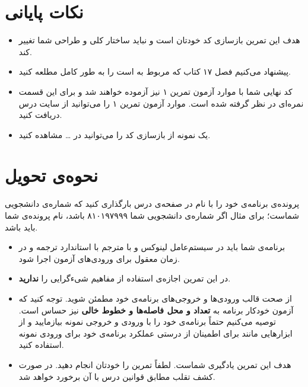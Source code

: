 \documentclass{utap}
\begin{document}
\section{نکات پایانی}
	  \begin{itemize}
	        \item
هدف این تمرین بازسازی کد خودتان است و نباید ساختار کلی و طراحی شما تغییر کند.
		\item
پیشنهاد می‌کنیم فصل ۱۷ کتاب  که مربوط به  است را به طور کامل مطلعه کنید.
		\item
کد نهایی شما با موارد آزمون تمرین ۱ نیز آزموده خواهند شد و برای این قسمت نمره‌ای در نظر گرفته شده است.
موارد آزمون تمرین ۱ را می‌توانید از سایت درس دریافت کنید.
		\item
یک نمونه از بازسازی کد را می‌توانید در \dots{} مشاهده کنید.  %

	  \end{itemize}

\section{نحوه‌ی تحویل}
    پرونده‌ی برنامه‌ی خود را با نام  در صفحه‌ی  درس بارگذاری کنید که  شماره‌ی دانشجویی شماست؛ برای مثال اگر شماره‌ی دانشجویی شما ۸۱۰۱۹۷۹۹۹ باشد، نام پرونده‌ی شما باید  باشد.
    \begin{itemize}
        \item
برنامه‌ی شما باید در سیستم‌عامل لینوکس و با مترجم  با استاندارد  ترجمه و در زمان معقول برای ورودی‌های آزمون اجرا شود.
        \item
در این تمرین اجازه‌ی استفاده از مفاهیم شیءگرایی را \textbf{ندارید}.
        \item
از صحت قالب ورودی‌ها و خروجی‌های برنامه‌ی خود مطمئن شوید. توجه کنید که آزمون خودکار برنامه به \textbf{تعداد و محل فاصله‌ها و خطوط خالی} نیز حساس است. توصیه می‌کنیم حتماً برنامه‌ی خود را با ورودی و خروجی نمونه بیازمایید و از ابزارهایی مانند  برای اطمینان از درستی عملکرد برنامه‌ی خود برای ورودی نمونه استفاده کنید.
        \item
هدف این تمرین یادگیری شماست. لطفاً تمرین را خودتان انجام دهید. در صورت کشف تقلب مطابق قوانین درس با آن برخورد خواهد شد.
    \end{itemize}
\end{document}
